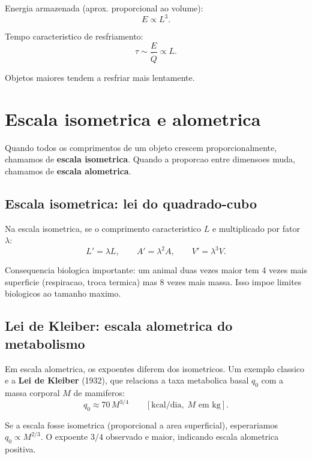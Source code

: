 \documentclass[12pt,a4paper,oneside]{book}
\theoremstyle{definition}
\begin{document}
Energia armazenada (aprox. proporcional ao volume):
\begin{equation}
E \propto L^3.
\end{equation}

Tempo caracteristico de resfriamento:
\begin{equation}
\tau \sim \frac{E}{\dot{Q}} \propto L.
\end{equation}

Objetos maiores tendem a resfriar mais lentamente.

\section{Escala isometrica e alometrica}

Quando todos os comprimentos de um objeto crescem proporcionalmente, chamamos de
\textbf{escala isometrica}. Quando a proporcao entre dimensoes muda, chamamos de
\textbf{escala alometrica}.

\subsection{Escala isometrica: lei do quadrado-cubo}

Na escala isometrica, se o comprimento caracteristico $L$ e multiplicado por fator $\lambda$:
\begin{equation}
L' = \lambda L, \qquad A' = \lambda^2 A, \qquad V' = \lambda^3 V.
\end{equation}

Consequencia biologica importante: um animal duas vezes maior tem 4 vezes mais superficie
(respiracao, troca termica) mas 8 vezes mais massa. Isso impoe limites biologicos ao tamanho maximo.

\subsection{Lei de Kleiber: escala alometrica do metabolismo}

Em escala alometrica, os expoentes diferem dos isometricos. Um exemplo classico e a
\textbf{Lei de Kleiber} (1932), que relaciona a taxa metabolica basal $q_0$ com a massa
corporal $M$ de mamiferos:
\begin{equation}
q_0 \approx 70\,M^{3/4} \qquad [\text{kcal/dia},\; M \text{ em kg}].
\end{equation}

Se a escala fosse isometrica (proporcional a area superficial), esperariamos $q_0 \propto M^{2/3}$.
O expoente $3/4$ observado e maior, indicando escala alometrica positiva.
\end{document}
